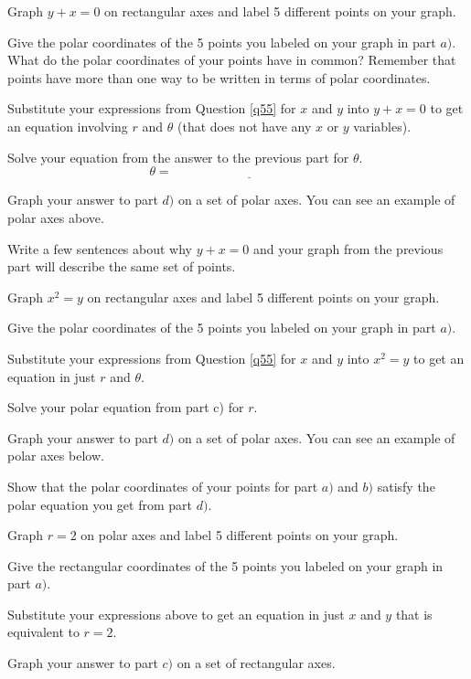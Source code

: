 \bq \be
\item Graph $y+x=0$ on rectangular axes and label 5 different points on your graph.
\item Give the polar coordinates of the 5 points you labeled on your graph in part $a)$. What do the polar coordinates of your points have in common? Remember that points have more than one way to be written in terms of polar coordinates.
\item Substitute your expressions from Question \ref{q55} for $x$ and $y$ into $y+x=0$ to get an equation involving $r$ and $\theta$ (that does not have any $x$ or $y$ variables).
\item Solve your equation from the answer to the previous part for $\theta$. $$\theta = \underline{\hspace{2in}} $$
\item Graph your answer to part $d)$ on a set of polar axes. You can see an example of polar axes above.
\item Write a few sentences about why $y+x=0$ and your graph from the previous part will describe the same set of points.
\ee
\eq

\bq
\be
\item Graph $x^2=y$ on rectangular axes and label 5 different points on your graph.
\item Give the polar coordinates of the 5 points you labeled on your graph in part $a)$.
\item Substitute your expressions from Question \ref{q55} for $x$ and $y$ into $x^2=y$ to get an equation in just $r$ and $\theta$.
\item Solve your polar equation from part c) for $r$.
\item Graph your answer to part $d)$ on a set of polar axes. You can see an example of polar axes below.
\item Show that the polar coordinates of your points for part $a)$ and $b)$ satisfy the polar equation you get from part $d)$.
\ee
\eq

\bq \be
\item Graph $r=2$ on polar axes and label 5 different points on your graph.
\item Give the rectangular coordinates of the 5 points you labeled on your graph in part $a)$.
\item Substitute your expressions above to get an equation in just $x$ and $y$ that is equivalent to $r=2$.
\item Graph your answer to part $c)$ on a set of rectangular axes.
\ee
\eq


